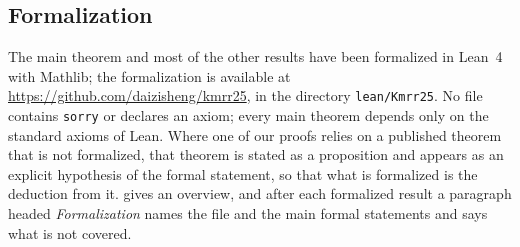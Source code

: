 \subsection*{Formalization}
The main theorem and most of the other results have been formalized in Lean~4 with Mathlib; the
formalization is available at \url{https://github.com/daizisheng/kmrr25}, in the directory
\nolinkurl{lean/Kmrr25}. No file contains \texttt{sorry} or declares an axiom; every main theorem
depends only on the standard axioms of Lean. Where one of our proofs relies on a published theorem
that is not formalized, that theorem is stated as a proposition and appears as an explicit
hypothesis of the formal statement, so that what is formalized is the deduction from it.  gives an overview, and
after each formalized result a paragraph headed \emph{Formalization} names the file and the
main formal statements and says what is not covered.

